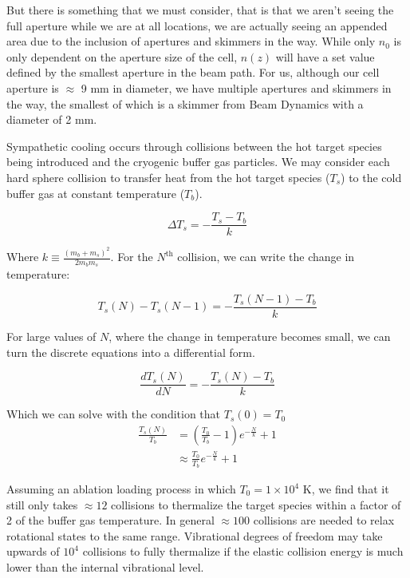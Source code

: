But there is something that we must consider, that is that we aren't seeing the full aperture while we are at all locations, we are actually seeing an appended area due to the inclusion of apertures and skimmers in the way. While only $n_0$ is only dependent on the aperture size of the cell, $n(z)$ will have a set value defined by the smallest aperture in the beam path. For us, although our cell aperture is $\approx$ 9 mm in diameter, we have multiple apertures and skimmers in the way, the smallest of which is a skimmer from Beam Dynamics with a diameter of 2 mm.

Sympathetic cooling occurs through collisions between the hot target species being introduced and the cryogenic buffer gas particles. We may consider each hard sphere collision to transfer heat from the hot target species ($T_s$) to the cold buffer gas at constant temperature ($T_b$).

\begin{equation*}
	\Delta T_s = -\frac{T_s - T_b}{k}
\end{equation*}

Where $k \equiv \frac{(m_b + m_s)^2}{2 m_b m_s}$. For the $N^{\text{th}}$ collision, we can write the change in temperature:

\begin{equation*}
	T_s(N) - T_s(N-1) = -\frac{T_s(N-1)-T_b}{k}
\end{equation*}

For large values of $N$, where the change in temperature becomes small, we can turn the discrete equations into a differential form.

\begin{equation*}
	\frac{d T_s(N)}{dN} = -\frac{T_s(N) - T_b}{k}
\end{equation*}

Which we can solve with the condition that $T_s(0)=T_0$
\begin{align*}
	\frac{T_s(N)}{T_b} & = \left(\frac{T_0}{T_b} - 1\right)e^{-\frac{N}{k}} +1 \\
	& \approx \frac{T_0}{T_b}e^{-\frac{N}{k}} + 1
\end{align*}

Assuming an ablation loading process in which $T_0=1 \times 10^4$ K, we find that it still only takes $\approx 12$ collisions to thermalize the target species within a factor of 2 of the buffer gas temperature. In general $\approx 100$ collisions are needed to relax rotational states to the same range. Vibrational degrees of freedom may take upwards of $10^4$ collisions to fully thermalize if the elastic collision energy is much lower than the internal vibrational level.

